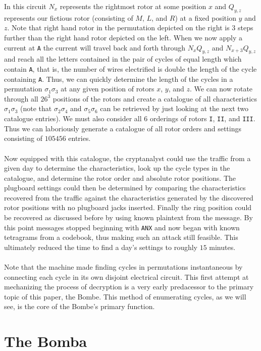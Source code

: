 In this circuit $N_x$ represents the rightmost rotor at some position $x$ and $Q_{y,z}$ represents our fictious rotor (consisting of $M$, $L$, and $R$) at a fixed position $y$ and $z$. Note that right hand rotor in the permutation depicted on the right is 3 steps further than the right hand rotor depicted on the left. When we now apply a current at \texttt{A} the current will travel back and forth through $N_xQ_{y,z}$ and $N_{x+3}Q_{y,z}$ and reach all the letters contained in the pair of cycles of equal length which contain \texttt{A}, that is, the number of wires electrified is double the length of the cycle containing \texttt{A}. Thus, we can quickly determine the length of the cycles in a permutation $\sigma_1\sigma_{3}$ at any given position of rotors ${x}$, $y$, and $z$. We can now rotate through all $26^3$ positions of the rotors and create a catalogue of all characteristics $\sigma_1\sigma_3$ (note that $\sigma_2\sigma_4$ and $\sigma_5\sigma_6$ can be retrieved by just looking at the next two catalogue entries). We must also consider all 6 orderings of rotors \texttt{I}, \texttt{II}, and \texttt{III}. Thus we can laboriously generate a catalogue of all rotor orders and settings consisting of $105456$ entries.
\\\\Now equipped with this catalogue, the cryptanalyst could use the traffic from a given day to determine the characteristics, look up the cycle types in the catalogue, and determine the rotor order and absolute rotor positions. The plugboard settings could then be determined by comparing the characteristics recovered from the traffic against the characteristics generated by the discovered rotor positions with no plugboard jacks inserted. Finally the ring position could be recovered as discussed before by using known plaintext from the message. By this point messages stopped beginning with \texttt{ANX} and now began with known tetragrams from a codebook, thus making such an attack still feasible. This ultimately reduced the time to find a day's settings to roughly $15$ minutes.
\\\\Note that the machine made finding cycles in permutations instantaneous by connecting each cycle in its own disjoint electrical circuit. This first attempt at mechanizing the process of decryption is a very early predacessor to the primary topic of this paper, the Bombe. This method of enumerating cycles, as we will see, is the core of the Bombe's primary function.
\section{The Bomba}

